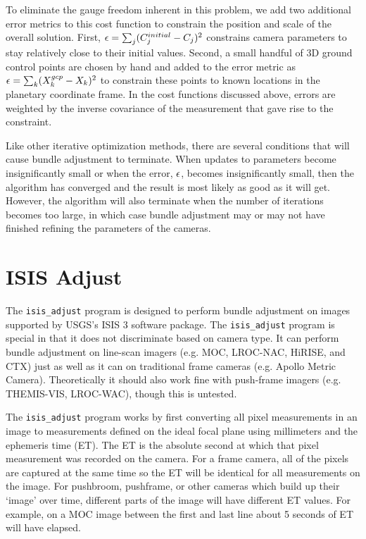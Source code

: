 To eliminate the gauge freedom inherent in this problem, we add two
additional error metrics to this cost function to constrain the position
and scale of the overall solution. First, ${\bf \epsilon} =
\sum_j(C_j^{initial}-C_j)^2$ constrains camera parameters to stay
relatively close to their initial values.  Second, a small handful of
3D ground control points are chosen by hand and added to the
error metric as ${\bf \epsilon} = \sum_k(X_k^{gcp}-X_k)^2$ to
constrain these points to known locations in the planetary coordinate
frame.  In the cost functions discussed above, errors are weighted by
the inverse covariance of the measurement that gave rise to the
constraint.

Like other iterative optimization methods, there are several
conditions that will cause bundle adjustment to terminate.  When
updates to parameters become insignificantly small or when the error,
${\bf \epsilon}$, becomes insignificantly small, then the algorithm
has converged and the result is most likely as good as it will get.
However, the algorithm will also terminate when the number of
iterations becomes too large, in which case bundle adjustment may or
may not have finished refining the parameters of the cameras.

\section{ISIS Adjust}

The \texttt{isis\_adjust} program is designed to perform bundle
adjustment on images supported by USGS's ISIS 3 software package.
The \texttt{isis\_adjust} program is special in that it does not
discriminate based on camera type. It can perform bundle adjustment
on line-scan imagers (e.g. MOC, LROC-NAC, HiRISE, and CTX) just
as well as it can on traditional frame cameras (e.g. Apollo
Metric Camera).  Theoretically it should also work fine with
push-frame imagers (e.g. THEMIS-VIS, LROC-WAC), though this is untested.

The \texttt{isis\_adjust} program works by first converting all
pixel measurements in an image to measurements defined on the ideal
focal plane using millimeters and the ephemeris time (ET). The ET
is the absolute second at which that pixel measurement was recorded
on the camera.  For a frame camera, all of the pixels are captured
at the same time so the ET will be identical for all measurements
on the image.  For pushbroom, pushframe, or other cameras which
build up their `image' over time, different parts of the image will
have different ET values.  For example, on a MOC image between the
first and last line about 5 seconds of ET will have elapsed.


